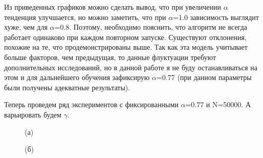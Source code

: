 \documentclass[a4paper]{report}
\theoremstyle{definition}
\theoremstyle{plain}
\theoremstyle{remark}
\theoremstyle{remark}
\theoremstyle{definition}
\begin{document}
Из приведенных графиков можно сделать вывод, что при увеличении $\alpha$ тенденция улучшается, но можно заметить, что при $\alpha$=1.0 зависимость выглядит хуже, чем для $\alpha$=0.8. Поэтому, необходимо пояснить, что алгоритм не всегда работает одинаково при каждом повторном запуске. Существуют отклонения, похожие на те, что продемонстрированы выше. Так как эта модель учитывает больше факторов, чем предыдущая, то данные флуктуации требуют дополнительных исследований, но в данной работе я не буду останавливаться на этом и для дальнейшего обучения зафиксирую $\alpha$=0.77 (при данном параметры были получены адекватные результаты).

Теперь проведем ряд экспериментов с фиксированными $\alpha$=0.77 и N=50000. А варьировать будем $\gamma$.
\begin{figure}[H]
    \begin{minipage}[H]{0.49\linewidth}
        (а)\\
    \end{minipage}
    \hfill
    \begin{minipage}[H]{0.49\linewidth}
        (б)\\

\end{minipage}
\end{figure}
\end{document}

